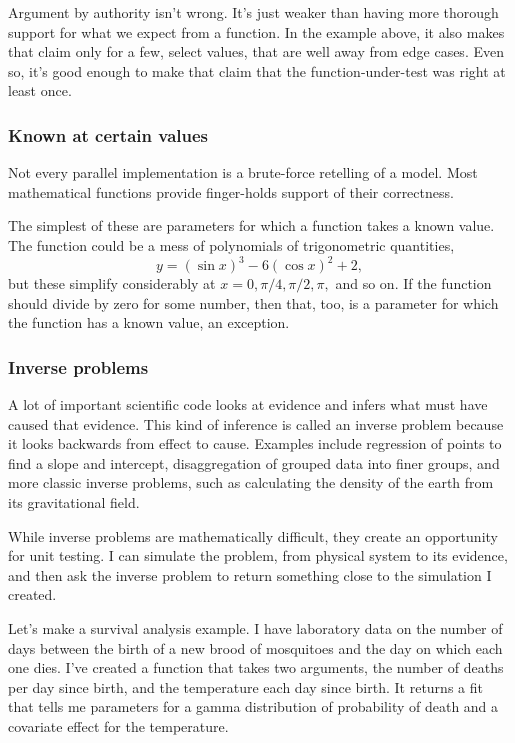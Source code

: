 \documentclass[fleqn,10pt]{olplainarticle}
\begin{document}
Argument by authority isn't wrong. It's just weaker than having
more thorough support for what we expect from a function.
In the example above, it also makes that claim only for a few,
select values, that are well away from edge cases.
Even so, it's good enough to make that claim that the
function-under-test was right at least once.


\subsubsection{Known at certain values}

Not every parallel implementation is a brute-force retelling
of a model. Most mathematical functions provide finger-holds
support of their correctness.

The simplest of these are parameters for which a function
takes a known value. The function could be a mess of
polynomials of trigonometric quantities,
\begin{equation}
  y = (\sin x)^3 - 6 (\cos x)^2 + 2,
\end{equation}
but these simplify considerably at $x=0, \pi/4, \pi/2, \pi,$
and so on. If the function should divide by zero for some
number, then that, too, is a parameter for which the function
has a known value, an exception.


\subsubsection{Inverse problems}

A lot of important scientific code looks at evidence and infers
what must have caused that evidence. This kind of inference is
called an inverse problem because it looks backwards from effect
to cause. Examples include regression of points to find a slope
and intercept, disaggregation of grouped data into finer groups,
and more classic inverse problems, such as calculating the density
of the earth from its gravitational field.

While inverse problems are mathematically difficult, they create
an opportunity for unit testing. I can simulate the
problem, from physical system to its evidence, and then ask
the inverse problem to return something close to the simulation
I created.

Let's make a survival analysis example. I have laboratory data
on the number of days between the birth of a new brood of mosquitoes
and the day on which each one dies. I've created a function that
takes two arguments, the number of deaths per day since birth,
and the temperature each day since birth. It returns a fit that
tells me parameters for a gamma distribution of probability of
death and a covariate effect for the temperature.
\end{document}
